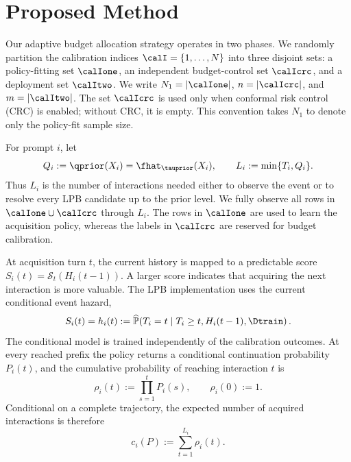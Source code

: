 
\section{Proposed Method}
\label{sec:method}

Our adaptive budget allocation strategy operates in two phases.  We randomly
partition the calibration indices $\calI=\{1,\ldots,N\}$ into three disjoint
sets: a policy-fitting set $\calIone$, an independent budget-control set
$\calIcrc$, and a deployment set $\calItwo$.  We write
$N_1=|\calIone|$, $n=|\calIcrc|$, and $m=|\calItwo|$.  The set
$\calIcrc$ is used only when conformal risk control (CRC) is enabled; without
CRC, it is empty.  This convention takes $N_1$ to denote only the policy-fit
sample size.

For prompt $i$, let
\begin{equation}
    Q_i:=\qprior(X_i)=\fhat_{\tauprior}(X_i),
    \qquad L_i:=\min\{T_i,Q_i\}.
    \label{eq:dapro_lpb_active_length}
\end{equation}
Thus $L_i$ is the number of interactions needed either to observe the event or
to resolve every LPB candidate up to the prior level.  We fully observe all
rows in $\calIone\cup\calIcrc$ through $L_i$.  The rows in $\calIone$ are
used to learn the acquisition policy, whereas the labels in $\calIcrc$ are
reserved for budget calibration.

At acquisition turn $t$, the current history is mapped to a predictable score
$S_i(t)=\mathcal S_t(H_i(t-1))$.  A larger score indicates that acquiring the
next interaction is more valuable.  The LPB implementation uses the current
conditional event hazard,
\begin{equation}
    S_i(t)=h_i(t)
    :=\widehat{\mathbb P}\!\left(
       T_i=t\mid T_i\geq t,H_i(t-1),\Dtrain
    \right).
    \label{eq:dapro_lpb_hazard_score}
\end{equation}
The conditional model is trained independently of the calibration outcomes.
At every reached prefix the policy returns a conditional continuation
probability $P_i(t)$, and the cumulative probability of reaching interaction
$t$ is
\begin{equation}
    \rho_i(t):=\prod_{s=1}^{t}P_i(s),
    \qquad \rho_i(0):=1.
    \label{eq:dapro_lpb_reach}
\end{equation}
Conditional on a complete trajectory, the expected number of acquired
interactions is therefore
\begin{equation}
    c_i(P):=\sum_{t=1}^{L_i}\rho_i(t).
    \label{eq:dapro_lpb_expected_cost}
\end{equation}

